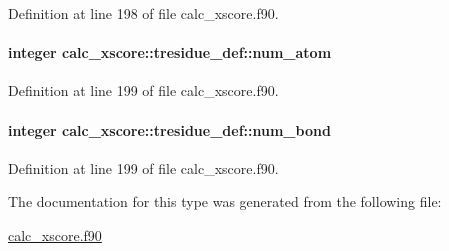 Definition at line 198 of file calc\-\_\-xscore.\-f90.

\hypertarget{structcalc__xscore_1_1tresidue__def_a135587d01a81b8e2064b60ef0cac1072}{
\paragraph[{num\-\_\-atom}]{\setlength{\rightskip}{0pt plus 5cm}integer calc\-\_\-xscore\-::tresidue\-\_\-def\-::num\-\_\-atom}}\label{structcalc__xscore_1_1tresidue__def_a135587d01a81b8e2064b60ef0cac1072}


Definition at line 199 of file calc\-\_\-xscore.\-f90.

\hypertarget{structcalc__xscore_1_1tresidue__def_a7d8d3858e156dbb9a37592e0eb877209}{
\paragraph[{num\-\_\-bond}]{\setlength{\rightskip}{0pt plus 5cm}integer calc\-\_\-xscore\-::tresidue\-\_\-def\-::num\-\_\-bond}}\label{structcalc__xscore_1_1tresidue__def_a7d8d3858e156dbb9a37592e0eb877209}


Definition at line 199 of file calc\-\_\-xscore.\-f90.



The documentation for this type was generated from the following file\-:\begin{DoxyCompactItemize}
\item 
\hyperlink{calc__xscore_8f90}{calc\-\_\-xscore.\-f90}\end{DoxyCompactItemize}
